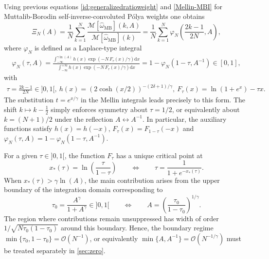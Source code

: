 \documentclass[pdflatex,sn-mathphys-num]{sn-jnl}
\theoremstyle{thmstyleone}
\numberwithin{equation}{section}
\begin{document}
Using previous equations \eqref{id:generalizedratioweight} and \eqref{Mellin-MBI} for Muttalib-Borodin self-inverse-convoluted P\'olya weights one obtains
\begin{equation}
    \Xi_N(A)=\frac{1}{N}\sum_{k=1}^{N}\frac{\mathcal{M}[\widehat{\omega}_{\mathrm{MB}}](k,A)}{\mathcal{M}[\widehat{\omega}_{\mathrm{MB}}](k)}=\frac{1}{N}\sum_{k=1}^{N}\varphi_{N}\left(\frac{2k-1}{2N},A\right),
\end{equation}
where $\varphi_{N}$ is defined as a Laplace-type integral
\begin{align}\label{phi.def}
    \varphi_{N}\left(\tau,A\right)=\frac{\int_{-\infty}^{\gamma\ln(A)}h\left( x \right)\exp\left( -N\,F_{\tau}\left( x \right)/\gamma \right)\mathrm{d}x}{\int_{-\infty}^{+\infty}h\left( x \right)\exp\left( -N\,F_{\tau}\left( x \right)/\gamma \right)\mathrm{d}x}=1-\varphi_{N}\left(1-\tau,A^{-1}\right)\in[0,1],
\end{align}
with
\begin{align}\label{notation}
     \tau=\frac{2k-1}{2N}\in]0,1[,\  h\left( x \right)=\left( 2\cosh(x/2)\right)^{-(2\delta+1)/\gamma},\  F_{\tau}\left( x \right)=\ln\left( 1+e^{ x} \right)-\tau x.
\end{align}
The substitution $t=e^{x/\gamma}$ in the Mellin integrals leads precisely to this form. The shift $k\mapsto k-\frac{1}{2}$ simply enforces symmetry about $\tau=1/2$, or equivalently about $k=(N+1)/2$ under the reflection $A\leftrightarrow A^{-1}$. In particular, the auxiliary functions satisfy $h(x)=h(-x)$, $F_\tau(x)=F_{1-\tau}(-x)$ and $\varphi_{N}(\tau,A)=1-\varphi_{N}(1-\tau,A^{-1})$.


For a given $\tau\in]0,1[$, the function $F_\tau$ has a unique critical point at
\begin{equation}
    x_*(\tau)=\ln\left(\frac{\tau}{1-\tau}\right) \qquad\Leftrightarrow\qquad \tau=\frac{1}{1+e^{-x_*(\tau)}}.
\end{equation}
When $x_{*}\left( \tau \right)>\gamma\ln(A)$, the main contribution arises from the upper boundary of the integration domain corresponding to
\begin{equation}\label{tau0.def}
    \tau_0=\frac{A^{\gamma}}{1+A^{\gamma}}\in]0,1[ \qquad\Leftrightarrow\qquad A=\left(\frac{\tau_0}{1-\tau_0}\right)^{1/\gamma}.
\end{equation}
The region where contributions remain unsuppressed has width of order $1/\sqrt{N\tau_0(1-\tau_0)}$ around this boundary.
Hence, the boundary regime $\min\{\tau_0,1-\tau_0\}=\mathcal{O}(N^{-1})$, or equivalently $\min\{A,A^{-1}\}=\mathcal{O}(N^{-1/\gamma})$ must be treated separately in \autoref{sec:zero}.
\end{document}
